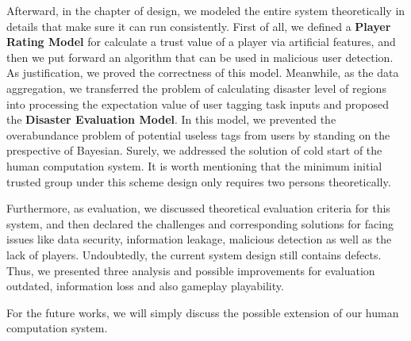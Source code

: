 Afterward, in the chapter of design, we modeled the entire system theoretically in details that make sure it can run consistently. First of all, we defined a \textbf{Player Rating Model}
for calculate a trust value of a player via artificial features, and then we put forward an algorithm
that can be used in malicious user detection. As justification, we proved the correctness of this model.
Meanwhile, as the data aggregation, we transferred the problem of calculating disaster level of regions into
processing the expectation value of user tagging task inputs and proposed the \textbf{Disaster Evaluation Model}.
In this model, we prevented the overabundance problem of potential useless tags from users by standing on the prespective of Bayesian. Surely, we addressed the solution of cold start of the human computation system.
It is worth mentioning that the minimum initial trusted group under this scheme design only requires two persons theoretically.

Furthermore, as evaluation, we discussed theoretical evaluation criteria for this system,
and then declared the challenges and corresponding solutions for facing issues like data security, information leakage, 
malicious detection as well as the lack of players.
Undoubtedly, the current system design still contains defects. Thus, we presented three analysis
and possible improvements for evaluation outdated, information loss and also gameplay playability. 

For the future works, we will simply discuss the possible extension of our human computation system.


